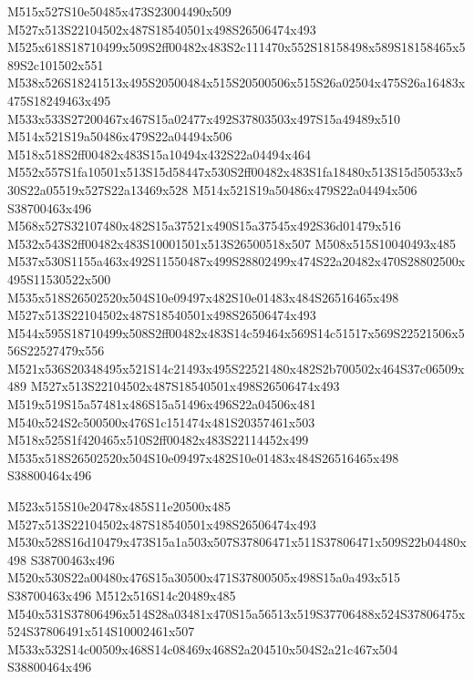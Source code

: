 \documentclass{article}
\begin{document}
\begin{multicols}{2}
M515x527S10e50485x473S23004490x509 M527x513S22104502x487S18540501x498S26506474x493 M525x618S18710499x509S2ff00482x483S2c111470x552S18158498x589S18158465x589S2c101502x551 M538x526S18241513x495S20500484x515S20500506x515S26a02504x475S26a16483x475S18249463x495 M533x533S27200467x467S15a02477x492S37803503x497S15a49489x510 M514x521S19a50486x479S22a04494x506 M518x518S2ff00482x483S15a10494x432S22a04494x464 M552x557S1fa10501x513S15d58447x530S2ff00482x483S1fa18480x513S15d50533x530S22a05519x527S22a13469x528 M514x521S19a50486x479S22a04494x506 S38700463x496 M568x527S32107480x482S15a37521x490S15a37545x492S36d01479x516 M532x543S2ff00482x483S10001501x513S26500518x507 M508x515S10040493x485 M537x530S1155a463x492S11550487x499S28802499x474S22a20482x470S28802500x495S11530522x500 M535x518S26502520x504S10e09497x482S10e01483x484S26516465x498 M527x513S22104502x487S18540501x498S26506474x493 M544x595S18710499x508S2ff00482x483S14c59464x569S14c51517x569S22521506x556S22527479x556 M521x536S20348495x521S14c21493x495S22521480x482S2b700502x464S37c06509x489 M527x513S22104502x487S18540501x498S26506474x493 M519x519S15a57481x486S15a51496x496S22a04506x481 M540x524S2c500500x476S1c151474x481S20357461x503 M518x525S1f420465x510S2ff00482x483S22114452x499 M535x518S26502520x504S10e09497x482S10e01483x484S26516465x498 S38800464x496

M523x515S10e20478x485S11e20500x485 M527x513S22104502x487S18540501x498S26506474x493 M530x528S16d10479x473S15a1a503x507S37806471x511S37806471x509S22b04480x498 S38700463x496 M520x530S22a00480x476S15a30500x471S37800505x498S15a0a493x515 S38700463x496 M512x516S14c20489x485 M540x531S37806496x514S28a03481x470S15a56513x519S37706488x524S37806475x524S37806491x514S10002461x507 M533x532S14c00509x468S14c08469x468S2a204510x504S2a21c467x504 S38800464x496


\end{multicols}
\end{document}
